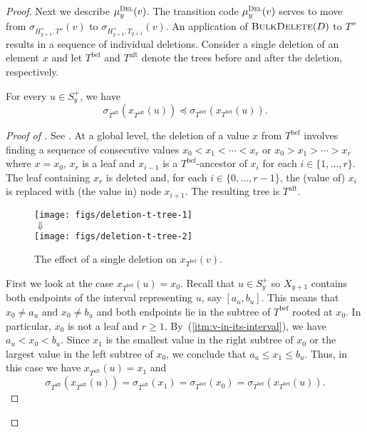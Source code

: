 \documentclass[kpfonts]{patmorin}
\let\leq\leqslant
\let\geq\geqslant
\let\preceq\preccurlyeq
\newcommand{\itemref}[1]{(\ref{#1})}
\begin{document}
\begin{proof}
  Next we describe $\mu_y^{\textsc{Del}}(v)$. 
  The transition code $\mu_y^{\textsc{Del}}(v)$ serves to move 
  from $\sigma_{H^+_{y+1},T''}(v)$ to $\sigma_{H^+_{y+1},T_{y+1}}(v)$. 
  An application of $\textsc{BulkDelete}(D)$ to $T''$ results in 
  a sequence of individual deletions.
  Consider a single deletion of an element $x$ and let $T^{\text{bef}}$ and $T^{\text{aft}}$ denote the trees before and after the deletion, respectively.

  \begin{clm}
  For every $u\in S^+_y$, we have
  \[
  \sigma_{T^{\text{aft}}}(x_{T^{\text{aft}}}(u))\preceq\sigma_{T^{\text{bef}}}(x_{T^{\text{bef}}}(u)).
  \]
  \end{clm}

  \begin{proof}[Proof of ]
    See .  At a global level, the deletion of a value $x$ from $T^{\text{bef}}$ involves finding a sequence of consecutive values $x_0<x_1<\cdots<x_r$ or $x_0>x_1>\cdots>x_r$ where $x=x_0$, $x_r$ is a leaf and $x_{i-1}$ is a $T^{\text{bef}}$-ancestor of $x_{i}$ for each $i\in\{1,\ldots,r\}$.  The leaf containing $x_r$ is deleted and, for each $i\in\{0,\ldots,r-1\}$, the (value of) $x_i$ is replaced with (the value in) node $x_{i+1}$. 
    The resulting tree is $T^{\text{aft}}$.    
    \begin{figure}
      \begin{center}
        \texttt{[image: figs/deletion-t-tree-1]}\\[1ex]
        $\Downarrow$\\[1ex]
        \texttt{[image: figs/deletion-t-tree-2]}
      \end{center}
      \caption{The effect of a single deletion on $x_{T^{\text{bef}}}(v)$.}
    \end{figure}

    First we look at the case $x_{T^{\text{bef}}}(u)=x_0$. 
    Recall that $u\in S^+_y$ so $X_{y+1}$ contains both endpoints of the interval representing $u$, say $[a_u,b_u]$. 
    This means that $x_0\neq a_u$ and $x_0\neq b_u$ and both endpoints lie in the subtree of $T^{\text{bef}}$ rooted at $x_0$. 
    In particular, $x_0$ is not a leaf and $r\geq 1$. 
    By~\itemref{itm:v-in-its-interval}, we have $a_u < x_0 < b_u$. 
    Since $x_1$ is the smallest value in the right subtree of $x_0$ or the largest value in the left subtree of $x_0$, we conclude that 
    $a_u\leq x_1\leq b_u$. 
    Thus, in this case we have $x_{T^{\text{aft}}}(u)=x_1$ and
    \[
    \sigma_{T^{\text{aft}}}(x_{T^{\text{aft}}}(u)) = \sigma_{T^{\text{aft}}}(x_1) = \sigma_{T^{\text{bef}}}(x_0) = \sigma_{T^{\text{bef}}}(x_{T^{\text{bef}}}(u)).
    \]


\end{proof}
\end{proof}
\end{document}
